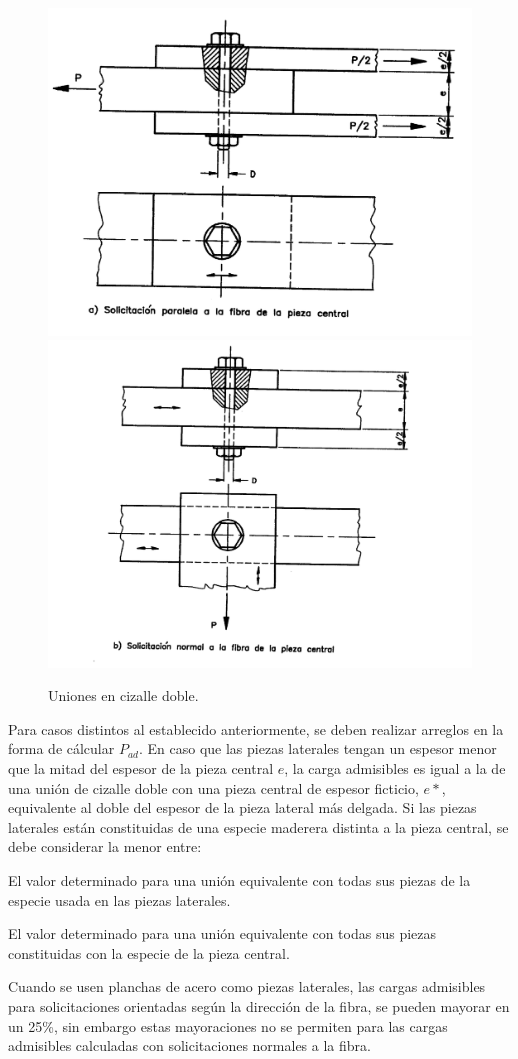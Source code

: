 \begin{figure}[H]
\centering
\includegraphics[width=0.5\linewidth, angle=1,origin=c]{Imagenes/figura_23A.pdf}%
\includegraphics[width=0.5\linewidth, angle=1,origin=c]{Imagenes/figura_23B.pdf}
\caption{Uniones en cizalle doble. \cite{nch1198}}
\label{fig:nch_23}
\end{figure}


Para casos distintos al establecido anteriormente, se deben realizar arreglos en la forma de cálcular $P_{ad}$. En caso que las piezas laterales tengan un espesor menor que la mitad del espesor de la pieza central $e$, la carga admisibles es igual a la de una unión de cizalle doble con una pieza central de espesor ficticio, $e*$, equivalente al doble del espesor de la pieza lateral más delgada. Si las piezas laterales están constituidas de una especie maderera distinta a la pieza central, se debe considerar la menor entre:
\begin{itemize*}
	\item El valor determinado para una unión equivalente con todas sus piezas de la especie usada en las piezas laterales.
	\item El valor determinado para una unión equivalente con todas sus piezas constituidas con la especie de la pieza central.
\end{itemize*}

Cuando se usen planchas de acero como piezas laterales, las cargas admisibles para solicitaciones orientadas según la dirección de la fibra, se pueden mayorar en un 25\%, sin embargo estas mayoraciones no se permiten para las cargas admisibles calculadas con solicitaciones normales a la fibra.

